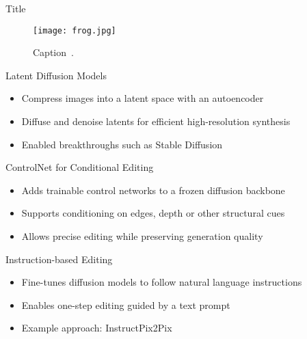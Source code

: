 \begin{refsection}
\begin{frame}{Title}
  \centering

  \begin{figure}
    \centering
    \texttt{[image: frog.jpg]}
    \caption{\scriptsize Caption~\parencite{greenwade93}.}
  \end{figure}

  \bottomleftrefs
\end{frame}
\end{refsection}

\begin{refsection}
\begin{frame}{Latent Diffusion Models}
  \begin{itemize}
    \item Compress images into a latent space with an autoencoder
    \item Diffuse and denoise latents for efficient high-resolution synthesis
    \item Enabled breakthroughs such as Stable Diffusion~\parencite{rombach2022highresolutionimagesynthesislatent}
  \end{itemize}
  \bottomleftrefs
\end{frame}
\end{refsection}

\begin{refsection}
\begin{frame}{ControlNet for Conditional Editing}
  \begin{itemize}
    \item Adds trainable control networks to a frozen diffusion backbone
    \item Supports conditioning on edges, depth or other structural cues
    \item Allows precise editing while preserving generation quality~\parencite{zhang2023addingconditionalcontroltexttoimage}
  \end{itemize}
  \bottomleftrefs
\end{frame}
\end{refsection}

\begin{refsection}
\begin{frame}{Instruction-based Editing}
  \begin{itemize}
    \item Fine-tunes diffusion models to follow natural language instructions
    \item Enables one-step editing guided by a text prompt
    \item Example approach: InstructPix2Pix~\parencite{brooks2023instructpix2pixlearningfollowimage}
  \end{itemize}
  \bottomleftrefs
\end{frame}
\end{refsection}
